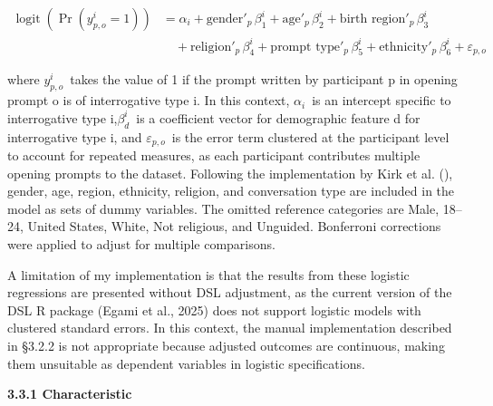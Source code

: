 \documentclass[
  12pt,
]{article}
\begin{document}
\[
\begin{aligned}
\operatorname{logit}\left(\Pr\left(y^{i}_{p,o} = 1\right)\right)
&= \alpha_i
+ \text{gender}'_{p} \, \beta^{i}_{1}
+ \text{age}'_{p} \, \beta^{i}_{2}
+ \text{birth region}'_{p} \, \beta^{i}_{3} \\
&\quad + \text{religion}'_{p} \, \beta^{i}_{4}
+ \text{prompt type}'_{p} \, \beta^{i}_{5}
+ \text{ethnicity}'_{p} \, \beta^{i}_{6}
+ \varepsilon_{p,o}
\end{aligned}
\]

where \(y_{p,o}^{i}\)~takes the value of 1 if the prompt written by participant p in opening prompt o is of interrogative type i. In this context, \(\alpha_{i}\)~is an intercept specific to interrogative type i,\(\beta_{d}^{i}\)~is a coefficient vector for demographic feature d for interrogative type i, and \(\varepsilon_{p,o}\)~is the error term clustered at the participant level to account for repeated measures, as each participant contributes multiple opening prompts to the dataset. Following the implementation by Kirk et al. (), gender, age, region, ethnicity, religion, and conversation type are included in the model as sets of dummy variables. The omitted reference categories are Male, 18--24, United States, White, Not religious, and Unguided. Bonferroni corrections were applied to adjust for multiple comparisons.

A limitation of my implementation is that the results from these logistic regressions are presented without DSL adjustment, as the current version of the DSL R package (Egami et al., 2025) does not support logistic models with clustered standard errors. In this context, the manual implementation described in §3.2.2 is not appropriate because adjusted outcomes are continuous, making them unsuitable as dependent variables in logistic specifications.

\textbf{3.3.1 Characteristic}
\end{document}
